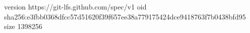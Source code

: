 version https://git-lfs.github.com/spec/v1
oid sha256:e3fbb0368dfcc57d51620f39f657ee38a779175424dce9418763f7b0438bfd95
size 1398256
